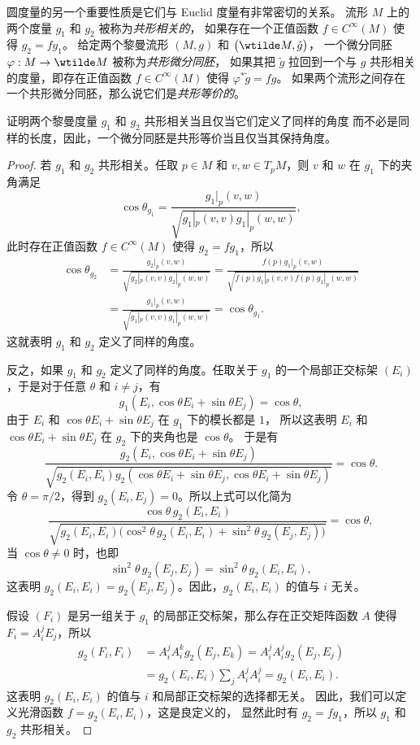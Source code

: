 圆度量的另一个重要性质是它们与 Euclid 度量有非常密切的关系。
流形 $M$ 上的两个度量 $g_1$ 和 $g_2$ 被称为\emph{共形相关的}，
如果存在一个正值函数 $f\in C^\infty(M)$ 使得 $g_2=fg_1$。
给定两个黎曼流形 $(M,g)$ 和 $\bigl(\wtilde M,\tilde g\bigr)$，
一个微分同胚 $\varphi:M\to\wtilde M$ 被称为\emph{共形微分同胚}，
如果其把 $\tilde g$ 拉回到一个与 $g$ 共形相关的度量，即存在正值函数
$f\in C^\infty(M)$ 使得 $\varphi^*\tilde g=f g$。
如果两个流形之间存在一个共形微分同胚，那么说它们是\emph{共形等价的}。

\begin{proposition}
  证明两个黎曼度量 $g_1$ 和 $g_2$ 共形相关当且仅当它们定义了同样的角度
  而不必是同样的长度，因此，一个微分同胚是共形等价当且仅当其保持角度。
\end{proposition}
\begin{proof}
  若 $g_1$ 和 $g_2$ 共形相关。任取 $p\in M$ 和 $v,w\in T_pM$，则
  $v$ 和 $w$ 在 $g_1$ 下的夹角满足
  \[
    \cos\theta_{g_1} =\frac{g_1|_p(v,w)}{\sqrt{g_1|_p(v,v)g_1|_p(w,w)}},
  \]
  此时存在正值函数 $f\in C^\infty(M)$ 使得 $g_2=f g_1$，所以
  \begin{align*}
    \cos\theta_{g_2}&=\frac{g_2|_p(v,w)}{\sqrt{g_2|_p(v,v)g_2|_p(w,w)}}
    =\frac{f(p)g_1|_p(v,w)}{\sqrt{f(p)g_1|_p(v,v)f(p)g_1|_p(w,w)}}\\
    &=\frac{g_1|_p(v,w)}{\sqrt{g_1|_p(v,v)g_1|_p(w,w)}}=\cos\theta_{g_1}.
  \end{align*}
  这就表明 $g_1$ 和 $g_2$ 定义了同样的角度。

  反之，如果 $g_1$ 和 $g_2$ 定义了同样的角度。任取关于 $g_1$ 的一个局部正交标架
  $(E_i)$，于是对于任意 $\theta$ 和 $i\neq j$，有
  \[
    g_1(E_i,\cos\theta E_i+\sin\theta E_j)=\cos\theta,
  \] 
  由于 $E_i$ 和 $\cos\theta E_i+\sin\theta E_j$ 在 $g_1$ 下的模长都是 $1$，
  所以这表明 $E_i$ 和 $\cos\theta E_i+\sin\theta E_j$ 在 $g_2$ 下的夹角也是 $\cos\theta$。
  于是有
  \[
    \frac{g_2(E_i,\cos\theta E_i+\sin\theta E_j)}{\sqrt{g_2(E_i,E_i)g_2(\cos\theta E_i+\sin\theta E_j,\cos\theta E_i+\sin\theta E_j)}}
    =\cos\theta.
  \]
  令 $\theta=\pi/2$，得到 $g_2(E_i,E_j)=0$。所以上式可以化简为 
  \[
    \frac{\cos\theta\, g_2(E_i,E_i)}{\sqrt{
      g_2(E_i,E_i)\bigl(
        \cos^2\theta\, g_2(E_i,E_i)+\sin^2\theta\, g_2(E_j,E_j)
      \bigr)
    }}=\cos\theta,
  \]
  当 $\cos\theta\neq 0$ 时，也即
  \[
    \sin^2\theta\, g_2(E_j,E_j)=\sin^2\theta\, g_2(E_i,E_i),
  \]
  这表明 $g_2(E_i,E_i)=g_2(E_j,E_j)$。因此，$g_2(E_i,E_i)$
  的值与 $i$ 无关。

  假设 $(F_i)$ 是另一组关于 $g_1$ 的局部正交标架，那么存在正交矩阵函数 $A$ 使得 $F_i=A_i^j E_j$，所以
  \begin{align*}
    g_2(F_i,F_i)&=A_i^j A_i^k g_2(E_j,E_k)
    =A_i^j A_i^j g_2(E_j,E_j)\\
    &=g_2(E_i,E_i)\sum_j A_i^j A_i^j =g_2(E_i,E_i).
  \end{align*}
  这表明 $g_2(E_i,E_i)$ 的值与 $i$ 和局部正交标架的选择都无关。
  因此，我们可以定义光滑函数 $f=g_2(E_i,E_i)$，这是良定义的，
  显然此时有 $g_2=f g_1$，所以 $g_1$ 和 $g_2$ 共形相关。
\end{proof}

